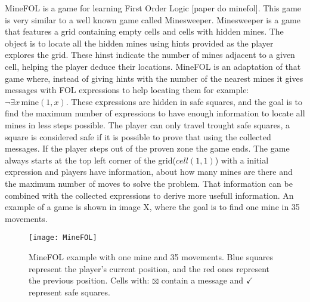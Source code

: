 MineFOL is a game for learning First Order Logic [paper do minefol]. This game is very similar to a well known game called Minesweeper. Minesweeper is a game that features a grid containing empty cells and cells with hidden mines. The object is to locate all the hidden mines using hints provided as the player explores the grid. These hinst indicate the number of mines adjacent to a given cell, helping the player deduce their locations. MineFOL is an adaptation of that game where, instead of giving hints with the number of the nearest mines it gives messages with \gls{FOL} expressions to help locating them for example: \(\neg \exists x \, \text{mine}(1, x)\). These expressions are hidden in safe squares, and the goal is to find the maximum number of expressions to have enough information to locate all mines in less steps possible. The player can only travel trought safe squares, a square is considered safe if it is possible to prove that using the collected messages. If the player steps out of the proven zone the game ends. The game always starts at the top left corner of the grid(\(cell(1,1)\)) with a initial expression and players have information, about how many mines are there and the maximum number of moves to solve the problem. That information can be combined with the collected expressions to derive more usefull information. An example of a game is shown in image X, where the goal is to find one mine in 35 movements.

\begin{figure}[htbp]
    \centering
    \texttt{[image: MineFOL]}
    \caption{MineFOL example with one mine and 35 movements. Blue squares represent the player's current position, and the red ones represent the previous position. Cells with: \(\boxtimes\) contain a message and \( \checkmark \) represent safe squares.}
\end{figure}

